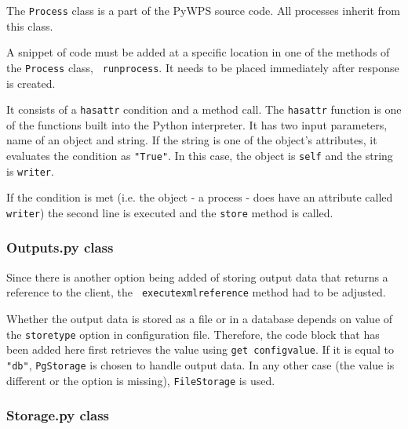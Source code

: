 The \texttt{Process} class is a part of the PyWPS source code. All
processes inherit from this class.

A snippet of code must be added at a specific location in one of the
methods of the \texttt{Process} class, \texttt{\textunderscore
  run\textunderscore process}. It needs to be placed immediately after
response is created.

It consists of a \texttt{hasattr} condition and a method call. The
\texttt{hasattr} function is one of the functions built into the
Python interpreter. It has two input parameters, name of an object and
string. If the string is one of the object's attributes, it evaluates
the condition as \texttt{"True"}. \cite{hasattr} In this case, the
object is \texttt{self} and the string is \texttt{writer}.

If the condition is met (i.e. the object - a process - does have an
attribute called \texttt{writer}) the second line is executed and the
\texttt{store} method is called.

\subsubsection{Outputs.py class}

Since there is another option being added of storing output data that
returns a reference to the client, the \texttt{\textunderscore
  execute\textunderscore xml\textunderscore reference} method had to
be adjusted.

Whether the output data is stored as a file or in a database depends
on value of the \texttt{store\textunderscore type} option in
configuration file. Therefore, the code block that has been added here
first retrieves the value using \texttt{get\textunderscore
  config\textunderscore value}. If it is equal to \texttt{"db"},
\texttt{PgStorage} is chosen to handle output data. In any other case
(the value is different or the option is missing),
\texttt{FileStorage} is used.

\subsubsection{Storage.py class}

